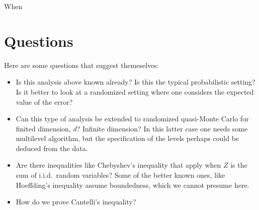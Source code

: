 \documentclass[12pt]{amsart}
\begin{document}
When 

\section{Questions}

Here are some questions that suggest themeselves:

\begin{itemize}

\item Is this analysis above known already?  Is this the typical probabilistic setting?  Is it better to look at a randomized setting where one considers the expected value of the error?

\item Can this type of analysis be extended to randomized quasi-Monte Carlo for finited dimension, $d$?  Infinite dimension?  In this latter case one needs some multilevel algorithm, but the specification of the levels perhaps could be deduced from the data.

\item Are there inequalities like Chebyshev's inequality that apply when $Z$ is the sum of i.i.d.\ random variables?  Some of the better known ones, like Hoeffding's inequality assume boundedness, which we cannot presume here.

\item How do we prove Cantelli's inequality?

\end{itemize}
\end{document}

